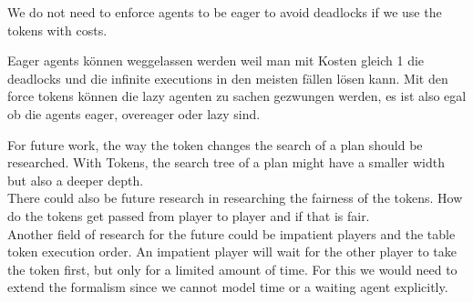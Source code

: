 We do not need to enforce agents to be eager to avoid deadlocks if we use the tokens with costs. 

Eager agents können weggelassen werden weil man mit Kosten gleich 1 die deadlocks und die infinite executions in den meisten fällen lösen kann. Mit den force tokens können die lazy agenten zu sachen gezwungen werden, es ist also egal ob die agents eager, overeager oder lazy sind.

For future work, the way the token changes the search of a plan should be researched. With Tokens, the search tree of a plan might have a smaller width but also a deeper depth. \\
There could also be future research in researching the fairness of the tokens. How do the tokens get passed from player to player and if that is fair. \\
Another field of research for the future could be impatient players and the table token execution order. An impatient player will wait for the other player to take the token first, but only for a limited amount of time. For this we would need to extend the formalism since we cannot model time or a waiting agent explicitly.
